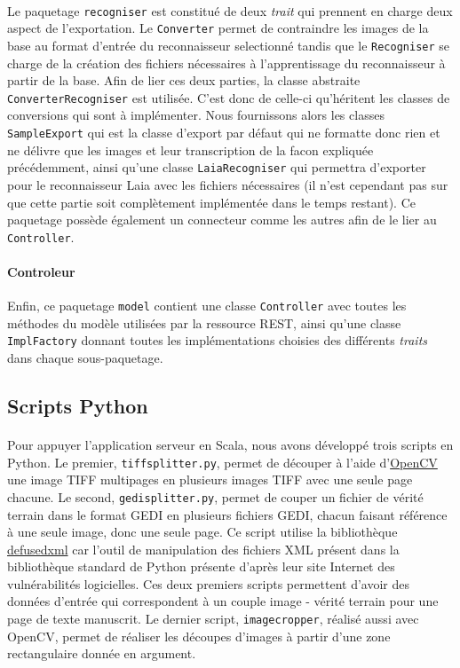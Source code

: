 \paragraph{}
Le paquetage \texttt{recogniser} est constitué de deux \textit{trait} qui prennent en charge deux aspect de l'exportation. Le \texttt{Converter} permet de contraindre les images de la base au format d'entrée du reconnaisseur selectionné tandis que le \texttt{Recogniser} se charge de la création des fichiers nécessaires à l'apprentissage du reconnaisseur à partir de la base. Afin de lier ces deux parties, la classe abstraite \texttt{ConverterRecogniser} est utilisée. C'est donc de celle-ci qu'héritent les classes de conversions qui sont à implémenter. Nous fournissons alors les classes \texttt{SampleExport} qui est la classe d'export par défaut qui ne formatte donc rien et ne délivre que les images et leur transcription de la facon expliquée précédemment, ainsi qu'une classe \texttt{LaiaRecogniser} qui permettra d'exporter pour le reconnaisseur Laia avec les fichiers nécessaires (il n'est cependant pas sur que cette partie soit complètement implémentée dans le temps restant).
Ce paquetage possède également un connecteur comme les autres afin de le lier au \texttt{Controller}.

\paragraph{Controleur}
Enfin, ce paquetage \texttt{model} contient une classe \texttt{Controller} avec toutes les méthodes du modèle utilisées par la ressource REST, ainsi qu'une classe \texttt{ImplFactory} donnant toutes les implémentations choisies des différents \textit{traits} dans chaque sous-paquetage.

\subsection{Scripts Python}

\paragraph{}
Pour appuyer l'application serveur en Scala, nous avons développé trois scripts en Python. Le premier, \texttt{tiffsplitter.py}, permet de découper à l'aide d'\href{https://opencv.org/}{OpenCV} une image TIFF multipages en plusieurs images TIFF avec une seule page chacune. Le second, \texttt{gedisplitter.py}, permet de couper un fichier de vérité terrain dans le format GEDI en plusieurs fichiers GEDI, chacun faisant référence à une seule image, donc une seule page. Ce script utilise la bibliothèque \href{https://pypi.org/project/defusedxml/}{defusedxml} car l'outil de manipulation des fichiers XML présent dans la bibliothèque standard de Python présente d'après leur site Internet des vulnérabilités logicielles. Ces deux premiers scripts permettent d'avoir des données d'entrée qui correspondent à un couple image - vérité terrain pour une page de texte manuscrit. Le dernier script, \texttt{imagecropper}, réalisé aussi avec OpenCV, permet de réaliser les découpes d'images à partir d'une zone rectangulaire donnée en argument.

